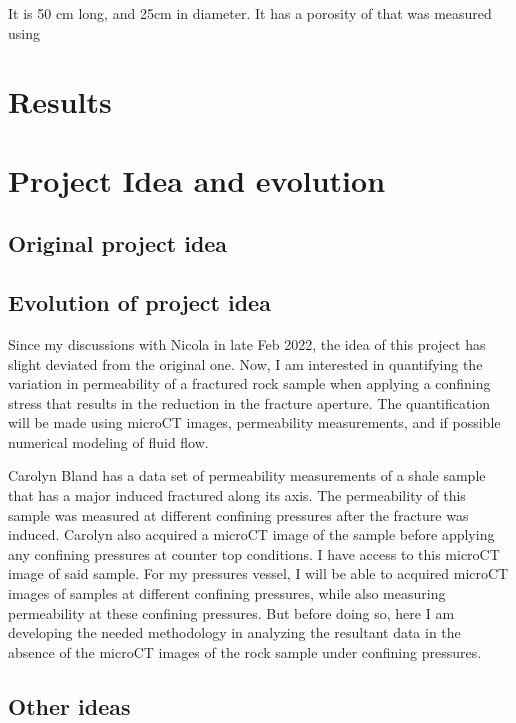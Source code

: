 \documentclass[12pt,titlepage]{article}
\begin{document}
It is 50 cm long, and 25cm in diameter. It has a porosity of  that was measured using  \citep{Bland2022}

\section{Results}
\pagebreak
\section{Project Idea and evolution}
\subsection{Original project idea}

\subsection{Evolution of project idea}
Since my discussions with Nicola in late Feb 2022, the idea of this project has slight deviated from the original one. Now, I am interested in quantifying the variation in permeability of a fractured rock sample when applying a confining stress that results in the reduction in the fracture aperture. The quantification will be made using microCT images, permeability measurements, and if possible numerical modeling of fluid flow. 

Carolyn Bland has a data set of permeability measurements of a shale sample that has a major induced fractured along its axis. The permeability of this sample was measured at different confining pressures after the fracture was induced. Carolyn also acquired a microCT image of the sample before applying any confining pressures at counter top conditions. I have access to this microCT image of said sample. For my pressures vessel, I will be able to acquired microCT images of samples at different confining pressures, while also measuring permeability at these confining pressures. But before doing so, here I am developing the needed methodology in analyzing the resultant data in the absence of the microCT images of the rock sample under confining pressures.

\subsection{Other ideas}
\end{document}
